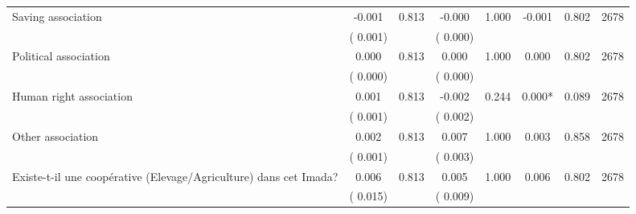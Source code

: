 \begin{tabular}{l*{7}{c}}
 Saving association       &             -0.001       &        0.813  &             -0.000       &        1.000  &             -0.001       &              0.802 &  2678 \\ 
                       &       (       0.001)             &                               &       (       0.000)                     &                               &                                               &                                &                      \\ 

 Political association       &              0.000       &        0.813  &              0.000       &        1.000  &              0.000       &              0.802 &  2678 \\ 
                       &       (       0.000)             &                               &       (       0.000)                     &                               &                                               &                                &                      \\ 

 Human right association       &              0.001       &        0.813  &             -0.002       &        0.244  &              0.000*       &              0.089 &  2678 \\ 
                       &       (       0.001)             &                               &       (       0.002)                     &                               &                                               &                                &                      \\ 

 Other association       &              0.002       &        0.813  &              0.007       &        1.000  &              0.003       &              0.858 &  2678 \\ 
                       &       (       0.001)             &                               &       (       0.003)                     &                               &                                               &                                &                      \\ 

 Existe-t-il une coopérative (Elevage/Agriculture) dans cet Imada?       &              0.006       &        0.813  &              0.005       &        1.000  &              0.006       &              0.802 &  2678 \\ 
                       &       (       0.015)             &                               &       (       0.009)                     &                               &                                               &                                &                      \\ 


\end{tabular}

